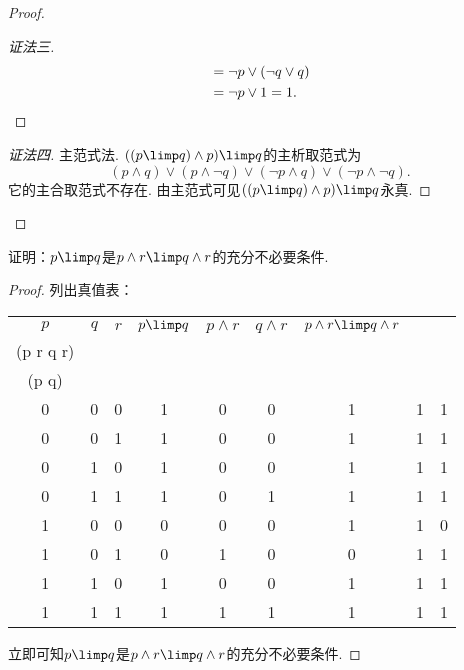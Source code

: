 \begin{example}
\begin{proof}
\begin{proof}[证法三]
\begin{align*}
	&= \neg p \lor (\neg q \lor q) \\
	&= \neg p \lor 1
	= 1.
	\qedhere
\end{align*}
\end{proof}
\begin{proof}[证法四]
主范式法.
\(((p \limp q) \land p) \limp q\)的主析取范式为\begin{equation*}
	(p \land q) \lor (p \land \neg q) \lor (\neg p \land q) \lor (\neg p \land \neg q).
\end{equation*}
它的主合取范式不存在.
由主范式可见\(((p \limp q) \land p) \limp q\)永真.
\end{proof}
\let\qed\relax
\end{proof}
\end{example}

\begin{example}
证明：\(p \limp q\)是\(p \land r \limp q \land r\)的充分不必要条件.
\begin{proof}
列出真值表：\begin{center}
	\begin{tabular}{*9c}
		\hline
		\(p\) & \(q\) & \(r\) & \(p \limp q\) & \(p \land r\) & \(q \land r\)
			& \(p \land r \limp q \land r\)
			& \(\begin{array}{c}
				(p \limp q) \limp \\
				(p \land r \limp q \land r)
			\end{array}\)
			& \(\begin{array}{c}
				(p \land r \limp q \land r) \\
				\limp (p \limp q)
			\end{array}\) \\
		\hline
		0 & 0 & 0 & 1 & 0 & 0 & 1 & 1 & 1 \\
		0 & 0 & 1 & 1 & 0 & 0 & 1 & 1 & 1 \\
		0 & 1 & 0 & 1 & 0 & 0 & 1 & 1 & 1 \\
		0 & 1 & 1 & 1 & 0 & 1 & 1 & 1 & 1 \\
		1 & 0 & 0 & 0 & 0 & 0 & 1 & 1 & 0 \\
		1 & 0 & 1 & 0 & 1 & 0 & 0 & 1 & 1 \\
		1 & 1 & 0 & 1 & 0 & 0 & 1 & 1 & 1 \\
		1 & 1 & 1 & 1 & 1 & 1 & 1 & 1 & 1 \\
		\hline
	\end{tabular}
\end{center}
立即可知\(p \limp q\)是\(p \land r \limp q \land r\)的充分不必要条件.
\end{proof}
\end{example}

